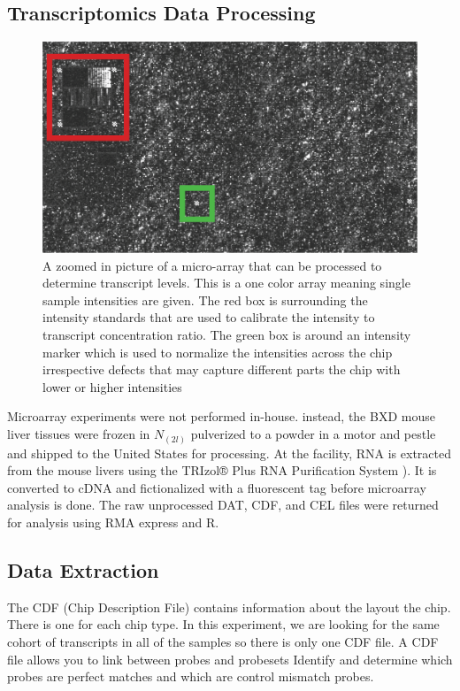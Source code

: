 \documentclass[a4paper,11pt,twoside]{book}
\begin{document}
	\subsection{Transcriptomics Data Processing}
	\begin{figure}
		\includegraphics[width = 1.0\linewidth]{3.Trancriptomics/Affimetrix_Chip_ZoomIn.png}
		\caption{A zoomed in picture of a micro-array that can be processed to determine transcript levels. This is a one color array meaning single sample intensities are given. The red box is surrounding the intensity standards that are used to calibrate the intensity to transcript concentration ratio. The green box is around an intensity marker which is used to normalize the intensities across the chip irrespective defects that may capture different parts the chip with lower or higher intensities}
		\label{fig: Zoomed-in Photograph of a Microarray}
	\end{figure}
	
    Microarray experiments were not performed in-house. instead, the BXD mouse liver tissues were frozen in $N_(2l)$ pulverized to a powder in a motor and pestle and shipped to the United States for processing. At the facility, RNA is extracted from the mouse livers using the TRIzol® Plus RNA Purification System \citep{Rio2010TRIzol}). It is converted to cDNA and fictionalized with a fluorescent tag before microarray analysis is done. The raw unprocessed DAT, CDF, and CEL files were returned for analysis using RMA express and R.
	
	
	\subsection{Data Extraction} 
	
	The CDF (Chip Description File) contains information about the layout the chip. There is one for each chip type. In this experiment, we are looking for the same cohort of transcripts in all of the samples so there is only one CDF file. A CDF file allows you to link between probes and probesets Identify and determine which probes are perfect matches and which are control mismatch probes\citep{Miller2009MicroArrays}.
	
\end{document}
